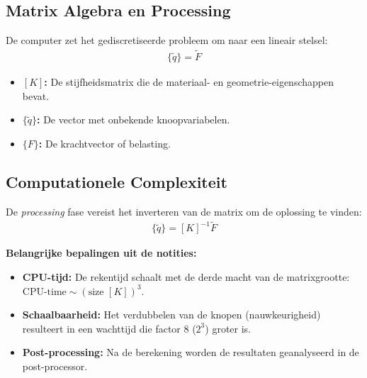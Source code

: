 \documentclass[a4paper,11pt,twoside]{report}
\begin{document}
\subsection*{Matrix Algebra en Processing}
De computer zet het gediscretiseerde probleem om naar een lineair stelsel:
\begin{align*}
    [K]\{\tilde{q}\} = \tilde{F}
\end{align*}

\begin{itemize}
    \item \textbf{$[K]$:} De stijfheidsmatrix die de materiaal- en geometrie-eigenschappen bevat.
    \item \textbf{$\{\tilde{q}\}$:} De vector met onbekende knoopvariabelen.
    \item \textbf{$\{F\}$:} De krachtvector of belasting.
\end{itemize}
\newpage
\begin{theorie}
    \subsection*{Computationele Complexiteit}
    De \textit{processing} fase vereist het inverteren van de matrix om de oplossing te vinden:
    \begin{align*}
        \{\tilde{q}\} = [K]^{-1} \tilde{F}
    \end{align*}

    \textbf{Belangrijke bepalingen uit de notities:}
    \begin{itemize}
        \item \textbf{CPU-tijd:} De rekentijd schaalt met de derde macht van de matrixgrootte:
              $\text{CPU-time} \sim (\text{size } [K])^3$.
        \item \textbf{Schaalbaarheid:} Het verdubbelen van de knopen (nauwkeurigheid) resulteert in een
              wachttijd die factor 8 ($2^3$) groter is.
        \item \textbf{Post-processing:} Na de berekening worden de resultaten geanalyseerd in de
              post-processor.
    \end{itemize}
\end{theorie}
\end{document}
